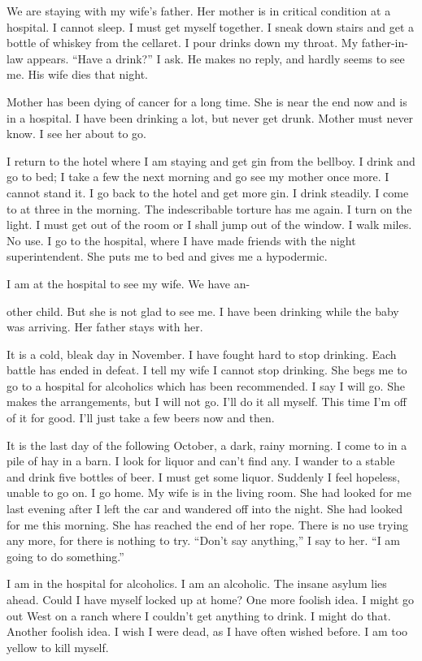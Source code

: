 \begin{biblechapter}
We are staying with my wife’s father. Her mother is in critical condition at a hospital. I cannot sleep. I must get myself together. I sneak down stairs and get a bottle of whiskey from the cellaret. I pour drinks down my throat. My father-in-law appears. “Have a drink?” I ask. He makes no reply, and hardly seems to see me. His wife dies that night.

Mother has been dying of cancer for a long time. She is near the end now and is in a hospital. I have been drinking a lot, but never get drunk. Mother must never know. I see her about to go.

I return to the hotel where I am staying and get gin from the bellboy. I drink and go to bed; I take a few the next morning and go see my mother once more. I cannot stand it. I go back to the hotel and get more gin. I drink steadily. I come to at three in the morning. The indescribable torture has me again. I turn on the light. I must get out of the room or I shall jump out of the window. I walk miles. No use. I go to the hospital, where I have made friends with the night superintendent. She puts me to bed and gives me a hypodermic.

I am at the hospital to see my wife. We have an-

other child. But she is not glad to see me. I have been drinking while the baby was arriving. Her father stays with her.

It is a cold, bleak day in November. I have fought hard to stop drinking. Each battle has ended in defeat. I tell my wife I cannot stop drinking. She begs me to go to a hospital for alcoholics which has been recommended. I say I will go. She makes the arrangements, but I will not go. I’ll do it all myself. This time I’m off of it for good. I’ll just take a few beers now and then.

It is the last day of the following October, a dark, rainy morning. I come to in a pile of hay in a barn. I look for liquor and can’t find any. I wander to a stable and drink five bottles of beer. I must get some liquor. Suddenly I feel hopeless, unable to go on. I go home. My wife is in the living room. She had looked for me last evening after I left the car and wandered off into the night. She had looked for me this morning. She has reached the end of her rope. There is no use trying any more, for there is nothing to try. “Don’t say anything,” I say to her. “I am going to do something.”

I am in the hospital for alcoholics. I am an alcoholic. The insane asylum lies ahead. Could I have myself locked up at home? One more foolish idea. I might go out West on a ranch where I couldn’t get anything to drink. I might do that. Another foolish idea. I wish I were dead, as I have often wished before. I am too yellow to kill myself.


\end{biblechapter}
